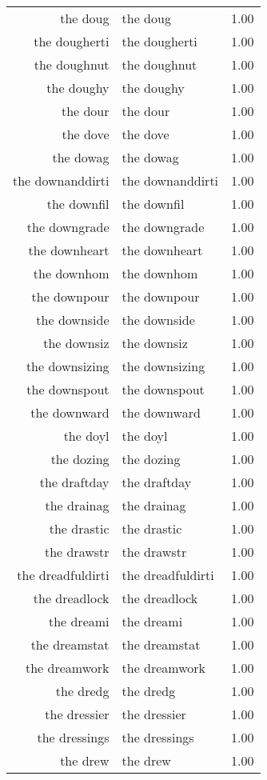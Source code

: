 \begin{table}[ht]
\begin{tabular}{rlr}
  the doug & the doug & 1.00 \\ 
  the dougherti & the dougherti & 1.00 \\ 
  the doughnut & the doughnut & 1.00 \\ 
  the doughy & the doughy & 1.00 \\ 
  the dour & the dour & 1.00 \\ 
  the dove & the dove & 1.00 \\ 
  the dowag & the dowag & 1.00 \\ 
  the downanddirti & the downanddirti & 1.00 \\ 
  the downfil & the downfil & 1.00 \\ 
  the downgrade & the downgrade & 1.00 \\ 
  the downheart & the downheart & 1.00 \\ 
  the downhom & the downhom & 1.00 \\ 
  the downpour & the downpour & 1.00 \\ 
  the downside & the downside & 1.00 \\ 
  the downsiz & the downsiz & 1.00 \\ 
  the downsizing & the downsizing & 1.00 \\ 
  the downspout & the downspout & 1.00 \\ 
  the downward & the downward & 1.00 \\ 
  the doyl & the doyl & 1.00 \\ 
  the dozing & the dozing & 1.00 \\ 
  the draftday & the draftday & 1.00 \\ 
  the drainag & the drainag & 1.00 \\ 
  the drastic & the drastic & 1.00 \\ 
  the drawstr & the drawstr & 1.00 \\ 
  the dreadfuldirti & the dreadfuldirti & 1.00 \\ 
  the dreadlock & the dreadlock & 1.00 \\ 
  the dreami & the dreami & 1.00 \\ 
  the dreamstat & the dreamstat & 1.00 \\ 
  the dreamwork & the dreamwork & 1.00 \\ 
  the dredg & the dredg & 1.00 \\ 
  the dressier & the dressier & 1.00 \\ 
  the dressings & the dressings & 1.00 \\ 
  the drew & the drew & 1.00 \\ 

\end{tabular}
\end{table}
